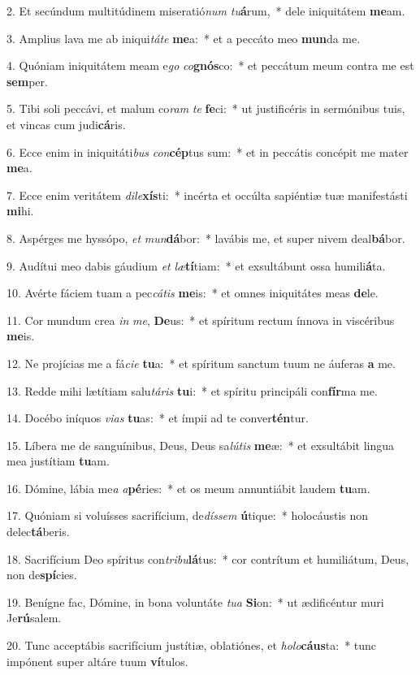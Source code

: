 2. Et secúndum multitúdinem miseratió\textit{num} \textit{tu}\textbf{á}rum,~*  dele iniquitátem \textbf{me}am.\

3. Amplius lava me ab iniqui\textit{tá}\textit{te} \textbf{me}a:~*  et a peccáto meo \textbf{mun}da me.\

4. Quóniam iniquitátem meam e\textit{go} \textit{co}\textbf{gnós}co:~*  et peccátum meum contra me est \textbf{sem}per.\

5. Tibi soli peccávi, et malum co\textit{ram} \textit{te} \textbf{fe}ci:~*  ut justificéris in sermónibus tuis, et vincas cum judi\textbf{cá}ris.\

6. Ecce enim in iniquitáti\textit{bus} \textit{con}\textbf{cép}tus sum:~*  et in peccátis concépit me mater \textbf{me}a.\

7. Ecce enim veritátem \textit{di}\textit{le}\textbf{xís}ti:~*  incérta et occúlta sapiéntiæ tuæ manifestásti \textbf{mi}hi.\

8. Aspérges me hyssópo, \textit{et} \textit{mun}\textbf{dá}bor:~*  lavábis me, et super nivem deal\textbf{bá}bor.\

9. Audítui meo dabis gáudium \textit{et} \textit{læ}\textbf{tí}tiam:~*  et exsultábunt ossa humili\textbf{á}ta.\

10. Avérte fáciem tuam a pec\textit{cá}\textit{tis} \textbf{me}is:~*  et omnes iniquitátes meas \textbf{de}le.\

11. Cor mundum crea \textit{in} \textit{me}, \textbf{De}us:~*  et spíritum rectum ínnova in viscéribus \textbf{me}is.\

12. Ne projícias me a fá\textit{ci}\textit{e} \textbf{tu}a:~*  et spíritum sanctum tuum ne áuferas \textbf{a} me.\

13. Redde mihi lætítiam salu\textit{tá}\textit{ris} \textbf{tu}i:~*  et spíritu principáli con\textbf{fír}ma me.\

14. Docébo iníquos \textit{vi}\textit{as} \textbf{tu}as:~*  et ímpii ad te conver\textbf{tén}tur.\

15. Líbera me de sanguínibus, Deus, Deus sa\textit{lú}\textit{tis} \textbf{me}æ:~*  et exsultábit lingua mea justítiam \textbf{tu}am.\

16. Dómine, lábia me\textit{a} \textit{a}\textbf{pé}ries:~*  et os meum annuntiábit laudem \textbf{tu}am.\

17. Quóniam si voluísses sacrifícium, de\textit{dís}\textit{sem} \textbf{ú}tique:~*  holocáustis non delec\textbf{tá}beris.\

18. Sacrifícium Deo spíritus con\textit{tri}\textit{bu}\textbf{lá}tus:~*  cor contrítum et humiliátum, Deus, non de\textbf{spí}cies.\

19. Benígne fac, Dómine, in bona voluntáte \textit{tu}\textit{a} \textbf{Si}on:~*  ut ædificéntur muri Je\textbf{rú}salem.\

20. Tunc acceptábis sacrifícium justítiæ, oblatiónes, et \textit{ho}\textit{lo}\textbf{cáus}ta:~*  tunc impónent super altáre tuum \textbf{ví}tulos.\

